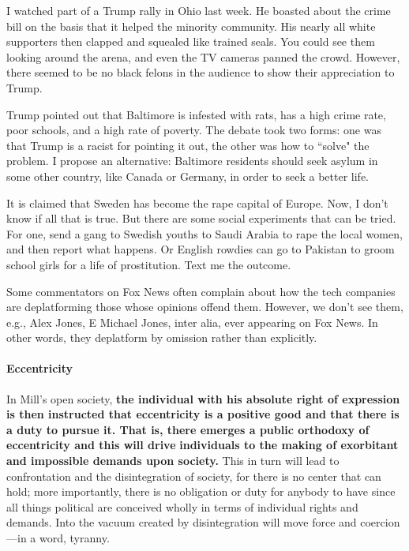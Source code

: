 I watched part of a Trump rally in Ohio last week. He boasted about the crime bill on the basis that it helped the minority community. His nearly all white supporters then clapped and squealed like trained seals. You could see them looking around the arena, and even the TV cameras panned the crowd. However, there seemed to be no black felons in the audience to show their appreciation to Trump.

Trump pointed out that Baltimore is infested with rats, has a high crime rate, poor schools, and a high rate of poverty. The debate took two forms: one was that Trump is a racist for pointing it out, the other was how to ``solve" the problem. I propose an alternative: Baltimore residents should seek asylum in some other country, like Canada or Germany, in order to seek a better life.

It is claimed that Sweden has become the rape capital of Europe. Now, I don't know if all that is true. But there are some social experiments that can be tried. For one, send a gang to Swedish youths to Saudi Arabia to rape the local women, and then report what happens. Or English rowdies can go to Pakistan to groom school girls for a life of prostitution. Text me the outcome.

Some commentators on Fox News often complain about how the tech companies are deplatforming those whose opinions offend them. However, we don't see them, e.g., Alex Jones, E Michael Jones, inter alia, ever appearing on Fox News. In other words, they deplatform by omission rather than explicitly.

\paragraph{Eccentricity}
\begin{quotex}
In Mill's open society, \textbf{the individual with his absolute right of expression is then instructed that eccentricity is a positive good and that there is a duty to pursue it. That is, there emerges a public orthodoxy of eccentricity and this will drive }\textbf{individuals to the making of exorbitant and impossible demands upon society.} This in turn will lead to confrontation and the disintegration of society, for there is no center that can hold; more importantly, there is no obligation or duty for anybody to have since all things political are conceived wholly in terms of individual rights and demands. Into the vacuum created by disintegration will move force and coercion—in a word, tyranny. 

\end{quotex}


